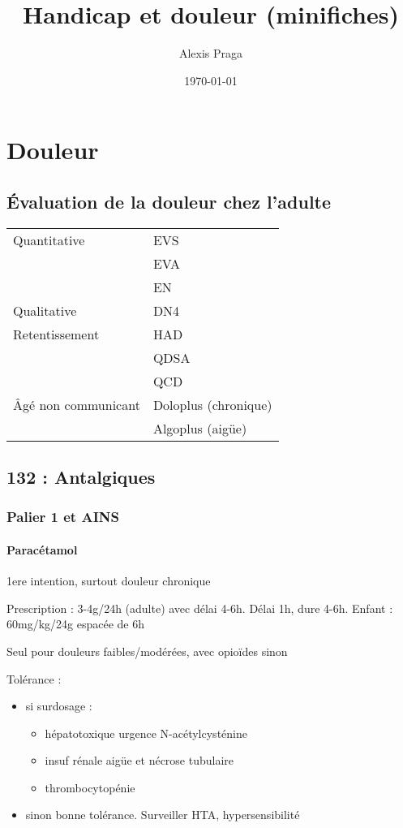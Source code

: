 \documentclass[11pt]{article}
\author{Alexis Praga}
\date{\today}
\title{Handicap et douleur (minifiches)}
\begin{document}
\maketitle
\tableofcontents



\section{Douleur}
\label{sec:orgd73d21c}

\subsection{Évaluation de la douleur chez l'adulte}
\label{sec:org7ab840c}
\begin{center}
\begin{tabular}{ll}
\toprule
Quantitative & \gls{EVS}\\
 & \gls{EVA}\\
 & \gls{EN}\\
Qualitative & DN4\\
Retentissement & \gls{HAD}\\
 & \gls{QDSA}\\
 & \gls{QCD}\\
Âgé non communicant & Doloplus (chronique)\\
 & Algoplus (aigüe)\\
\bottomrule
\end{tabular}
\end{center}
\subsection{132 : Antalgiques}
\label{sec:org98c4ca6}
\subsubsection{Palier 1 et AINS}
\label{sec:orgf631e4f}
\paragraph{Paracétamol}
\label{sec:org0b7baec}
1ere intention, surtout douleur chronique

Prescription : 3-4g/24h (adulte) avec délai 4-6h. Délai 1h, dure 4-6h. Enfant : 60mg/kg/24g
espacée de 6h 

Seul pour douleurs faibles/modérées, avec opioïdes sinon

Tolérance :
\begin{itemize}
\item si surdosage : 
\begin{itemize}
\item hépatotoxique \thus urgence \skull \thus N-acétylcysténine
\item insuf rénale aigüe et nécrose tubulaire
\item thrombocytopénie
\end{itemize}
\item sinon bonne tolérance. Surveiller HTA, hypersensibilité
\end{itemize}
\end{document}
